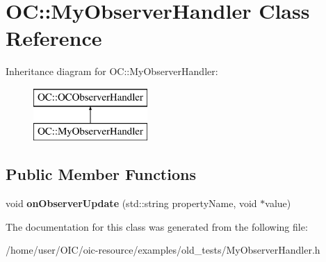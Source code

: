 \hypertarget{classOC_1_1MyObserverHandler}{}\section{O\+C\+:\+:My\+Observer\+Handler Class Reference}
\label{classOC_1_1MyObserverHandler}
Inheritance diagram for O\+C\+:\+:My\+Observer\+Handler\+:\begin{figure}[H]
\begin{center}
\leavevmode
\includegraphics[height=2.000000cm]{classOC_1_1MyObserverHandler}
\end{center}
\end{figure}
\subsection*{Public Member Functions}
\begin{DoxyCompactItemize}
\item 
\hypertarget{classOC_1_1MyObserverHandler_a8aeabd5306be9576ef7c21abb6df3b0a}{}void {\bfseries on\+Observer\+Update} (std\+::string property\+Name, void $\ast$value)\label{classOC_1_1MyObserverHandler_a8aeabd5306be9576ef7c21abb6df3b0a}

\end{DoxyCompactItemize}


The documentation for this class was generated from the following file\+:\begin{DoxyCompactItemize}
\item 
/home/user/\+O\+I\+C/oic-\/resource/examples/old\+\_\+tests/My\+Observer\+Handler.\+h\end{DoxyCompactItemize}
